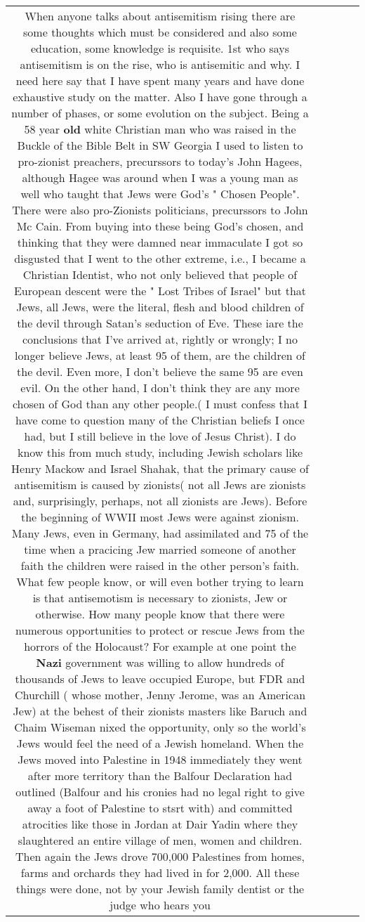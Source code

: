 \documentclass[11pt]{article}
\newlength\mylength
\begin{document}
\begin{center}
\begin{longtable}{|C{.65\mylength}|C{.30\mylength}|C{.12\mylength}|C{.12\mylength}|C{.12\mylength}|}
  \small When anyone talks about antisemitism rising there are some thoughts which must be considered and also some education, some knowledge is requisite. 1st who says antisemitism is on the rise, who is antisemitic and why. I need here say that I have spent many years and have done exhaustive study on the matter. Also I have gone through a number of phases, or some evolution on the subject. Being a 58 year \textbf{old} white Christian man who was raised in the Buckle of the Bible Belt in SW Georgia I used to listen to pro-zionist preachers, precurssors to today's John Hagees, although Hagee was around when I was a young man as well who taught that Jews were God's " Chosen People". There were also pro-Zionists politicians, precurssors to John Mc Cain. From buying into these being God's chosen, and thinking that they were damned near immaculate I got so disgusted that I went to the other extreme, i.e., I became a Christian Identist, who not only believed that people of European descent were the " Lost Tribes of Israel" but that Jews, all Jews, were the literal, flesh and blood children of the devil through Satan's seduction of Eve. These iare the conclusions that I've arrived at, rightly or wrongly; I no longer believe Jews, at least 95 of them, are the children of the devil. Even more, I don't believe the same 95 are even evil. On the other hand, I don't think they are any more chosen of God than any other people.( I must confess that I have come to question many of the Christian beliefs I once had, but I still believe in the love of Jesus Christ). I do know this from much study, including Jewish scholars like Henry Mackow and Israel Shahak, that the primary cause of antisemitism is caused by zionists( not all Jews are zionists and, surprisingly, perhaps, not all zionists are Jews). Before the beginning of WWII most Jews were against zionism. Many Jews, even in Germany, had assimilated and 75 of the time when a pracicing Jew married someone of another faith the children were raised in the other person's faith. What few people know, or will even bother trying to learn is that antisemotism is necessary to zionists, Jew or otherwise. How many people know that there were numerous opportunities to protect or rescue Jews from the horrors of the Holocaust? For example at one point the \textbf{Nazi} government was willing to allow hundreds of thousands of Jews to leave occupied Europe, but FDR and Churchill ( whose mother, Jenny Jerome, was an American Jew) at the behest of their zionists masters like Baruch and Chaim Wiseman nixed the opportunity, only so the world's Jews would feel the need of a Jewish homeland. When the Jews moved into Palestine in 1948 immediately they went after more territory than the Balfour Declaration had outlined (Balfour and his cronies had no legal right to give away a foot of Palestine to stsrt with) and committed atrocities like those in Jordan at Dair Yadin where they slaughtered an entire village of men, women and children. Then again the Jews drove 700,000 Palestines from homes, farms and orchards they had lived in for 2,000.  All these things were done, not by your Jewish family dentist or the judge who hears you 
\end{longtable}
\end{center}
\end{document}
